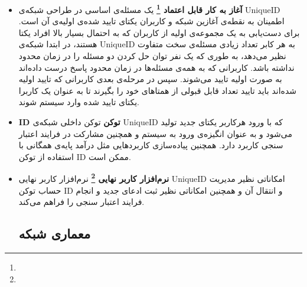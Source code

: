 \documentclass{article}
\begin{document}
\begin{itemize}
\item \textbf{آغاز به کار قابل اعتماد \footnote{}}
یک مسئله‌ی اساسی در طراحی شبکه‌ی UniqueID اطمینان به نقطه‌ی آغازین شبکه و کاربران یکتای تایید‌ شده‌ی اولیه‌ی آن است. برای دست‌یابی به یک مجموعه‌ی اولیه از کاربران که به احتمال بسیار بالا افراد یکتا هستند، در ابتدا شبکه‌ی UniqueID به هر کابر تعداد زیادی مسئله‌ی سخت متفاوت نظیر  می‌دهد، به طوری که یک نفر توان حل کردن دو مسئله را در زمان محدود نداشته باشد. کاربرانی که به همه‌ی مسئله‌ها در زمان محدود پاسخ درست داده‌اند به صورت اولیه تایید می‌شوند. سپس در مرحله‌ی بعدی کاربرانی که تایید اولیه شده‌اند باید تایید تعداد قابل قبولی از همتاهای خود را بگیرند تا به عنوان یک کاربرا یکتای تایید شده وارد سیستم شوند.

\item \textbf{ID توکن} 
توکن داخلی شبکه‌ی UniqueID که با ورود هرکاربر یکتای جدید تولید می‌شود و به عنوان انگیزه‌ی ورود به سیستم و همچنین مشارکت در فرایند اعتبار سنجی کاربرد دارد. همچنین پیاده‌سازی کاربردهایی مثل درآمد پایه‌ی همگانی با استفاده از توکن ID ممکن است.

\item \textbf{نرم‌افزار کاربر نهایی \footnote{}}
نرم‌افزار کاربر نهایی UniqueID امکاناتی نظیر مدیریت حساب توکن ID و انتقال آن و همچنین امکاناتی نظیر ثبت ادعای جدید و انجام فرایند اعتبار سنجی را فراهم می‌کند.

\subsection*{معماری شبکه}


\end{itemize}
\end{document}
